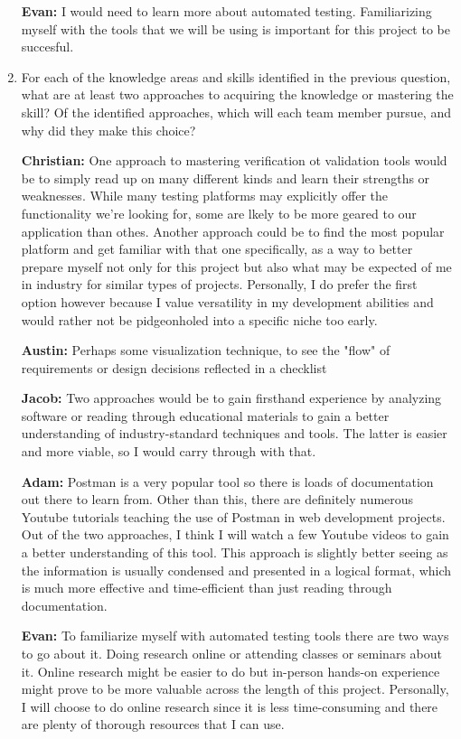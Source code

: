 \documentclass[12pt, titlepage]{article}
\begin{document}
\begin{enumerate}
  \textbf{Evan:} I would need to learn more about automated testing. Familiarizing myself with the tools that we will be using is important for this project to be succesful.

  \item For each of the knowledge areas and skills identified in the previous
  question, what are at least two approaches to acquiring the knowledge or
  mastering the skill?  Of the identified approaches, which will each team
  member pursue, and why did they make this choice?

  \textbf{Christian:} One approach to mastering verification ot validation tools would be to simply read up on many different kinds and learn their strengths or weaknesses. While many testing platforms may explicitly offer the functionality we're looking for, some are lkely to be more geared to our application than othes. Another approach could be to find the most popular platform and get familiar with that one specifically, as a way to better prepare myself not only for this project but also what may be expected of me in industry for similar types of projects. Personally, I do prefer the first option however because I value versatility in my development abilities and would rather not be pidgeonholed into a specific niche too early.
  
  \textbf{Austin:} Perhaps some visualization technique, to see the "flow" of requirements or design decisions reflected in a checklist
  
  \textbf{Jacob:} Two approaches would be to gain firsthand experience by analyzing software or reading through educational materials to gain a better understanding of industry-standard techniques and tools. The latter is easier and more viable, so I would carry through with that.

  \textbf{Adam:} Postman is a very popular tool so there is loads of documentation out there to learn from. Other than this, there are definitely numerous Youtube tutorials teaching the use of Postman in web development projects. Out of the two approaches, I think I will watch a few Youtube videos to gain a better understanding of this tool. This approach is slightly better seeing as the information is usually condensed and presented in a logical format, which is much more effective and time-efficient than just reading through documentation. 

  \textbf{Evan:} To familiarize myself with automated testing tools there are two ways to go about it. Doing research online or attending classes or seminars about it. Online research might be easier to do but in-person hands-on experience might prove to be more valuable across the length of this project. Personally, I will choose to do online research since it is less time-consuming and there are plenty of thorough resources that I can use.
  \end{enumerate}
\end{document}
